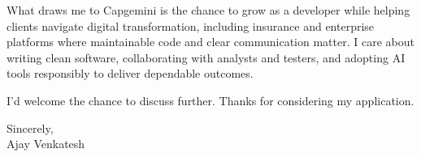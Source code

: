 \documentclass[letterpaper,11pt]{article}
\begin{document}
What draws me to Capgemini is the chance to grow as a developer while helping clients navigate digital transformation, including insurance and enterprise platforms where maintainable code and clear communication matter. I care about writing clean software, collaborating with analysts and testers, and adopting AI tools responsibly to deliver dependable outcomes.

I'd welcome the chance to discuss further. Thanks for considering my application.

\vspace{12pt}
Sincerely, \\
Ajay Venkatesh
\end{document}
